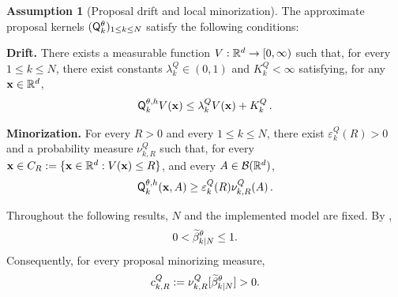 \documentclass[11pt]{article}
\theoremstyle{plain}
\theoremstyle{definition}
\newtheorem{assumption}[theorem]{Assumption}
\theoremstyle{remark}
\begin{document}
\begin{assumption}[Proposal drift and local minorization]
\label{ass:proposal_harris}
The approximate proposal kernels $(\mk{k}[\theta])_{1\le k\le N}$ satisfy the
following conditions:

\begin{assumplist}

\item \textbf{Drift.}
There exists a measurable function $V: \mathbb{R}^d \to [0,\infty)$ such that, for every $1 \le k \le N$, there exist constants $\lambda_k^Q\in(0,1)$ and $K_k^Q<\infty$ satisfying, for any $\mathbf{x} \in \mathbb{R}^d$,
\begin{equation} \label{eq:drift_Q}
\mk{k}[\theta,h] V(\x) \le \lambda_k^Q V(\x) + K_k^Q \eqsp.
\end{equation}


\item \textbf{Minorization.}
For every $R>0$ and every $1\le k\le N$, there exist
$\varepsilon_k^Q(R)>0$ and a probability measure $\nu_{k,R}^Q$ such that, for every $\mathbf{x} \in C_R := \{ \mathbf{x} \in \mathbb{R}^d: V(\mathbf{x}) \le R\} $, and every $A \in \mathcal{B}(\mathbb{R}^d)$,
\begin{equation} \label{eq:minorization_Q}
\mk{k}[\theta,h](\x,A) \ge \varepsilon_k^Q(R)\nu_{k,R}^Q(A) \eqsp.
\end{equation}


\end{assumplist}
\end{assumption}







Throughout the following results, $N$ and the implemented model are
fixed. By ,
\[
0<
\normbackwardfun{k}{N}[\theta]
\le1.
\]
Consequently, for every proposal minorizing measure,
\begin{equation}
\label{eq:minoration_cQ}
c_{k,R}^Q
\eqdef
\nu_{k,R}^Q[
\normbackwardfun{k}{N}[\theta]]
>0.
\end{equation}
\end{document}
